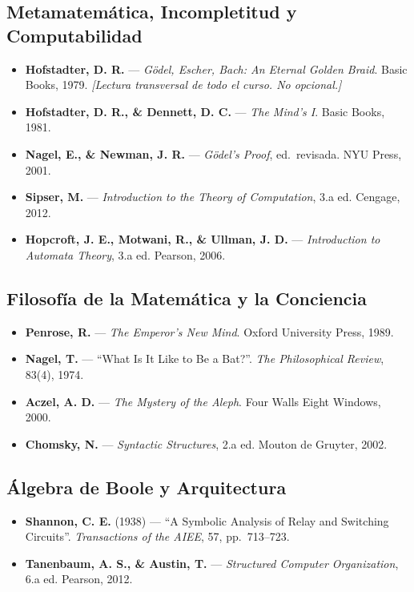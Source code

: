 \documentclass[11pt, letterpaper]{article}
\begin{document}
\subsection*{Metamatem\'atica, Incompletitud y Computabilidad}
\begin{itemize}
  \item \textbf{Hofstadter, D. R.} --- \emph{G\"odel, Escher, Bach: An Eternal Golden Braid}. Basic Books, 1979. \textit{[Lectura transversal de todo el curso. No opcional.]}
  \item \textbf{Hofstadter, D. R., \& Dennett, D. C.} --- \emph{The Mind's I}. Basic Books, 1981.
  \item \textbf{Nagel, E., \& Newman, J. R.} --- \emph{G\"odel's Proof}, ed.\ revisada. NYU Press, 2001.
  \item \textbf{Sipser, M.} --- \emph{Introduction to the Theory of Computation}, 3.a ed. Cengage, 2012.
  \item \textbf{Hopcroft, J. E., Motwani, R., \& Ullman, J. D.} --- \emph{Introduction to Automata Theory}, 3.a ed. Pearson, 2006.
\end{itemize}

\subsection*{Filosof\'ia de la Matem\'atica y la Conciencia}
\begin{itemize}
  \item \textbf{Penrose, R.} --- \emph{The Emperor's New Mind}. Oxford University Press, 1989.
  \item \textbf{Nagel, T.} --- ``What Is It Like to Be a Bat?''. \textit{The Philosophical Review}, 83(4), 1974.
  \item \textbf{Aczel, A. D.} --- \emph{The Mystery of the Aleph}. Four Walls Eight Windows, 2000.
  \item \textbf{Chomsky, N.} --- \emph{Syntactic Structures}, 2.a ed. Mouton de Gruyter, 2002.
\end{itemize}

\subsection*{\'Algebra de Boole y Arquitectura}
\begin{itemize}
  \item \textbf{Shannon, C. E.} (1938) --- ``A Symbolic Analysis of Relay and Switching Circuits''. \textit{Transactions of the AIEE}, 57, pp.\ 713--723.
  \item \textbf{Tanenbaum, A. S., \& Austin, T.} --- \emph{Structured Computer Organization}, 6.a ed. Pearson, 2012.
\end{itemize}
\end{document}
